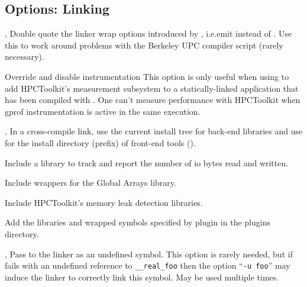 \documentclass[english]{article}
\begin{document}
\subsection{Options: Linking}

\begin{Description}

\item[\Opt{-dw}, \Opt{--double-wrap}]
Double quote the linker wrap options introduced by ,
i.e.emit  instead of .
Use this to work around problems with the Berkeley UPC compiler script (rarely necessary).

\item[\Opt{--disable-gprof}]
Override and disable  instrumentation  This option
is only useful when using  to add HPCToolkit's
measurement subsystem to a statically-linked application 
that has been compiled with . One can't measure 
performance with HPCToolkit when gprof instrumentation 
is active in the same execution.

\item[\OptArg{-fe}{dir}, \OptArg{--front-end}{dir}]
In a cross-compile link,
use the current install tree for back-end libraries and
use  for the install directory (prefix) of front-end tools ().

\item[\Opt{--io}]
Include a library to track and report the number of io bytes read and written.

\item[\Opt{--ga}]
Include wrappers for the Global Arrays library.

\item[\Opt{--memleak}]
Include HPCToolkit's memory leak detection libraries.

\item[\OptArg{--plugin}{name}]
Add the libraries and wrapped symbols specified by plugin  in the plugins directory.

\item[\OptArg{-u}{symbol}, \OptArg{--undefined}{symbol}]
Pass  to the linker as an undefined symbol.
This option is rarely needed,
but if  fails with an undefined reference to \texttt{\_\_real\_foo}
then the option ``\texttt{-u foo}'' may induce the linker to correctly link this symbol.
May be used multiple times.

\end{Description}
\end{document}
